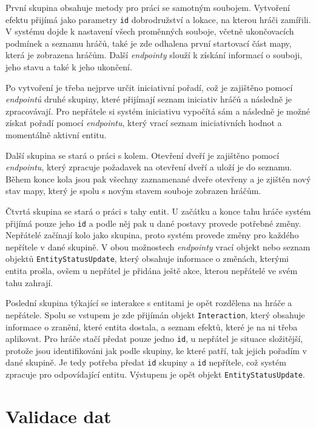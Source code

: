 

První skupina obsahuje metody pro práci se samotným soubojem. Vytvoření efektu přijímá jako parametry \texttt{id} dobrodružství a lokace, na kterou hráči zamířili. V systému dojde k nastavení všech proměnných souboje, včetně ukončovacích podmínek a seznamu hráčů, také je zde odhalena první startovací část mapy, která je zobrazena hráčům. Další \textit{endpointy} slouží k získání informací o souboji, jeho stavu a také k jeho ukončení.

Po vytvoření je třeba nejprve určit iniciativní pořadí, což je zajištěno pomocí \textit{endpointů} druhé skupiny, které přijímají seznam iniciativ hráčů a následně je zpracovávají. Pro nepřátele si systém iniciativu vypočítá sám a následně je možné získat pořadí pomocí \textit{endpointu}, který vrací seznam iniciativních hodnot a momentálně aktivní entitu.

Další skupina se stará o práci s kolem. Otevření dveří je zajištěno pomocí \textit{endpointu}, který zpracuje požadavek na otevření dveří a uloží je do seznamu. Během konce kola jsou pak všechny zaznamenané dveře otevřeny a je zjištěn nový stav mapy, který je spolu s novým stavem souboje zobrazen hráčům.

Čtvrtá skupina se stará o práci s tahy entit. U začátku a konce tahu hráče systém přijímá pouze jeho \texttt{id} a podle něj pak u dané postavy provede potřebné změny. Nepřátelé začínají kolo jako skupina, proto systém provede změny pro každého nepřítele v dané skupině. V obou možnostech \textit{endpointy} vrací objekt nebo seznam objektů \texttt{EntityStatusUpdate}, který obsahuje informace o změnách, kterými entita prošla, ovšem u nepřátel je přidána ještě akce, kterou nepřátelé ve svém tahu zahrají.

Poslední skupina týkající se interakce s entitami je opět rozdělena na hráče a nepřátele. Spolu se vstupem je zde přijímán objekt \texttt{Interaction}, který obsahuje informace o zranění, které entita dostala, a seznam efektů, které je na ni třeba aplikovat. Pro hráče stačí předat pouze jedno \texttt{id}, u nepřátel je situace složitější, protože jsou identifikováni jak podle skupiny, ke které patří, tak jejich pořadím v dané skupině. Je tedy potřeba předat \texttt{id} skupiny a \texttt{id} nepřítele, což systém zpracuje pro odpovídající entitu. Výstupem je opět objekt \texttt{EntityStatusUpdate}.

\section{Validace dat}
\label{sec:validation}

